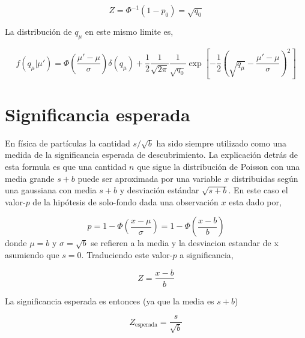 \begin{equation}
  Z = \Phi^{-1} (1-p_0) = \sqrt{q_0}
\end{equation}


La distribución de $q_\mu$ en este mismo limite es,

\begin{equation}
  f(q_\mu|\mu') = \Phi\left(\frac{\mu'-\mu}{\sigma}\right) \delta(q_\mu) +
  \frac{1}{2}\frac{1}{\sqrt{2\pi}}\frac{1}{\sqrt{q_0}} \exp \left[ -\frac{1}{2} \left( \sqrt{q_\mu} - \frac{\mu'-\mu}{\sigma} \right)^2\right]
\end{equation}


\section{Significancia esperada} %



En física de partículas la cantidad $s/\sqrt{b}$ ha sido siempre utilizado como
una medida de la significancia esperada de descubrimiento. La explicación detrás
de esta formula es que una cantidad $n$ que sigue la distribución de Poisson con
una media grande $s+b$ puede ser aproximada por una variable $x$ distribuidas según
una gaussiana con media $s+b$ y desviación estándar $\sqrt{s+b}$. En este caso
el valor-$p$ de la hipótesis de solo-fondo dada una observación $x$ esta dado por,

\begin{equation}
  p = 1 - \Phi \left( \frac{x-\mu}{\sigma} \right) = 1 - \Phi \left( \frac{x-b}{b} \right)
\end{equation}
%
donde $\mu=b$ y $\sigma = \sqrt{b}$ se refieren a la media y la desviacion estandar de x
asumiendo que $s=0$. Traduciendo este valor-$p$ a significancia,

\begin{equation}
  Z = \frac{x-b}{b}
\end{equation}

La significancia esperada es entonces (ya que la media es $s+b$)

\begin{equation}
  Z_\text{esperada} = \frac{s}{\sqrt{b}}
  \label{eq:Zsimple}
\end{equation}

